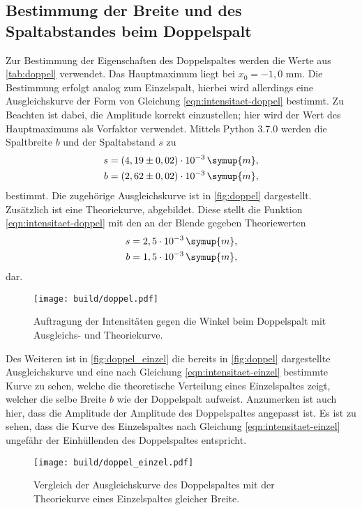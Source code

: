\subsection{Bestimmung der Breite und des Spaltabstandes beim Doppelspalt}
    Zur Bestimmung der Eigenschaften des Doppelspaltes werden die Werte aus \autoref{tab:doppel} verwendet. Das Hauptmaximum liegt bei 
    $x_0 = -1,0$ mm. Die Bestimmung erfolgt analog zum Einzelspalt, hierbei wird allerdings eine Ausgleichskurve der Form von Gleichung \eqref{eqn:intensitaet-doppel}
    bestimmt. Zu Beachten ist dabei, die Amplitude korrekt einzustellen; hier wird der Wert des Hauptmaximums als Vorfaktor verwendet.
    Mittels Python 3.7.0 werden die Spaltbreite $b$ und der Spaltabstand $s$ zu 
    \begin{align*}
        s &= (4,19 \pm 0,02) \cdot 10^{-3} \, \symup{m}, \\
        b &= (2,62 \pm 0,02) \cdot 10^{-3} \, \symup{m},
    \end{align*}
    bestimmt. Die zugehörige Ausgleichskurve ist in \autoref{fig:doppel} dargestellt. Zusätzlich ist eine Theoriekurve, abgebildet. Diese 
    stellt die Funktion \eqref{eqn:intensitaet-doppel} mit den an der Blende gegeben Theoriewerten
    \begin{align*}
        s &= 2,5 \cdot 10^{-3} \, \symup{m}, \\
        b &= 1,5 \cdot 10^{-3} \, \symup{m},
    \end{align*}
    dar. 
    
    \begin{figure}
        \centering
        \texttt{[image: build/doppel.pdf]}
        \caption{Auftragung der Intensitäten gegen die Winkel beim Doppelspalt mit Ausgleichs- und Theoriekurve.}
        \label{fig:doppel}
    \end{figure}

    
    Des Weiteren ist in \autoref{fig:doppel_einzel} die bereits in \autoref{fig:doppel} dargestellte Ausgleichskurve und eine nach Gleichung
    \eqref{eqn:intensitaet-einzel} bestimmte Kurve zu sehen, welche die theoretische Verteilung eines Einzelspaltes zeigt, welcher die selbe 
    Breite $b$ wie der Doppelspalt aufweist. Anzumerken ist auch hier, dass die Amplitude der Amplitude des Doppelspaltes angepasst ist.
    Es ist zu sehen, dass die Kurve des Einzelspaltes nach Gleichung \eqref{eqn:intensitaet-einzel} ungefähr der Einhüllenden des Doppelspaltes entspricht.

    \begin{figure}
        \centering
        \texttt{[image: build/doppel\_einzel.pdf]}
        \caption{Vergleich der Ausgleichskurve des Doppelspaltes mit der Theoriekurve eines Einzelspaltes gleicher Breite.}
        \label{fig:doppel_einzel}
    \end{figure}


    